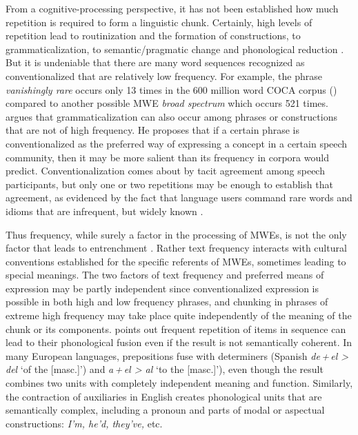 \documentclass[output=paper]{langscibook}
\begin{document}
From a cognitive-processing perspective, it has not been established how much repetition is required to form a linguistic chunk. Certainly, high levels of repetition lead to routinization and the formation of constructions, to grammaticalization, to semantic\slash pragmatic change and phonological reduction \citep{Bybee2003,Haiman1994,Croft2000}. But it is undeniable that there are many word sequences recognized as conventionalized that are relatively low frequency. For example, the phrase \textit{vanishingly rare} occurs only 13 times in the 600 million word COCA corpus (\citealt{Davies2008}) compared to another possible MWE \textit{broad spectrum} which occurs 521 times. \citet{Hoffman2004} argues that grammaticalization can also occur among phrases or constructions that are not of high frequency. He proposes that if a certain phrase is conventionalized as the preferred way of expressing a concept in a certain speech community, then it may be more salient than its frequency in corpora would predict. Conventionalization comes about by tacit agreement among speech participants, but only one or two repetitions may be enough to establish that agreement, as evidenced by the fact that language users command rare words and idioms that are infrequent, but widely known \citep[30--31]{Wray2002}. 

Thus frequency, while surely a factor in the processing of MWEs, is not the only factor that leads to entrenchment \citep{Wray2002,Schmid2017}. Rather text frequency interacts with cultural conventions established for the specific referents of MWEs, sometimes leading to special meanings. The two factors of text frequency and preferred means of expression may be partly independent since conventionalized expression is possible in both high and low frequency phrases, and chunking in phrases of extreme high frequency may take place quite independently of the meaning of the chunk or its components. \citet{Bybee2002} points out frequent repetition of items in sequence can lead to their phonological fusion even if the result is not semantically coherent. In many European languages, prepositions fuse with determiners (Spanish \textit{de\,+\,el > del} ‘of the [masc.]’) and \textit{a\,+\,el > al} ‘to the [masc.]’), even though the result combines two units with completely independent meaning and function. Similarly, the contraction of auxiliaries in English creates phonological units that are semantically complex, including a pronoun and parts of modal or aspectual constructions: \textit{I’m, he’d, they’ve,} etc. 
\end{document}
